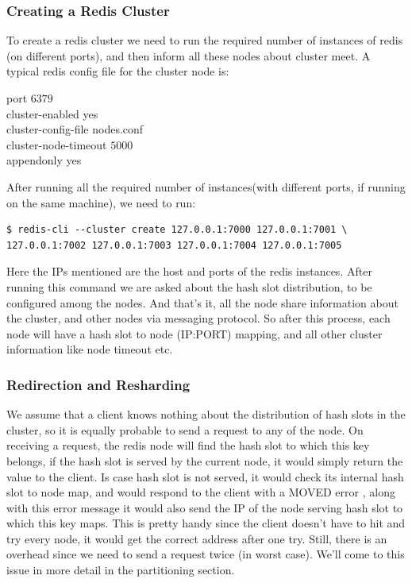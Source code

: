 \documentclass[11pt]{article}
\begin{document}
\subsubsection*{Creating a Redis Cluster}
To create a redis cluster we need to run the required number of instances of redis
(on different ports), and then inform all these nodes about cluster meet. A typical
redis config file for the cluster node is:
\begin{file}
port $6379$ \\
cluster-enabled yes \\
cluster-config-file nodes.conf \\
cluster-node-timeout $5000$ \\
appendonly yes \\
\end{file}

After running all the required number of instances(with different ports, if
running on the same machine), we need to run:
\begin{lstlisting}
$ redis-cli --cluster create 127.0.0.1:7000 127.0.0.1:7001 \
127.0.0.1:7002 127.0.0.1:7003 127.0.0.1:7004 127.0.0.1:7005 
\end{lstlisting}
Here the IPs mentioned are the host and ports of the redis instances. After 
running this command we are asked about the hash slot distribution, to be configured
among the nodes. And that's it, all the node share information about the cluster,
and other nodes via messaging protocol. So after this process, each node will have a
hash slot to node (IP:PORT) mapping, and all other cluster information like node timeout etc.

\subsubsection*{Redirection and Resharding}
We assume that a client knows nothing about the distribution of hash slots in the cluster,
so it is equally probable to send a request to any of the node.
On receiving a request, the redis node will find the hash slot to which this key
belongs, if the hash slot is served by the current node, it would simply return the value
to the client. Is case hash slot is not served, it would check its internal hash slot
to node map, and would respond to the client with a MOVED error \cite{redis}, along with this error
message it would also send the IP of the node serving hash slot to which this key maps.
This is pretty handy since the client doesn't have to hit and try every node,
it would get the correct address after one try. Still, there is an overhead since we
need to send a request twice (in worst case). We'll come to this issue in more detail
in the partitioning section.
\\
\end{document}
